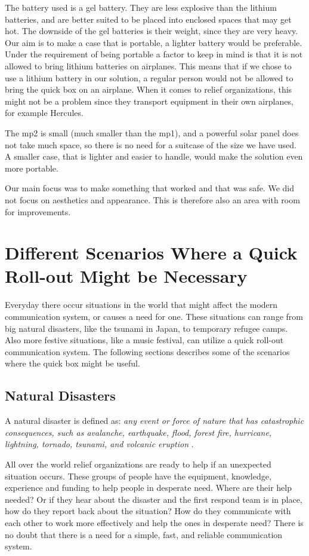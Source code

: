 The battery used is a gel battery. They are less explosive than the lithium batteries, and are better suited to be placed into enclosed spaces that may get hot. The downside of the gel batteries is their weight, since they are very heavy. Our aim is to make a case that is portable, a lighter battery would be preferable. Under the requirement of being portable a factor to keep in mind is that it is not allowed to bring lithium batteries on airplanes. This means that if we chose to use a lithium battery in our solution, a regular person would not be allowed to bring the \gls{quick} box on an airplane. When it comes to relief organizations, this might not be a problem since they transport equipment in their own airplanes, for example Hercules. 

The \gls{mp2} is small (much smaller than the \gls{mp1}), and a powerful solar panel does not take much space, so there is no need for a suitcase of the size we have used. A smaller case, that is lighter and easier to handle, would make the solution even more portable. 

Our main focus was to make something that worked and that was safe. We did not focus on aesthetics and appearance. This is therefore also an area with room for improvements. 

 
\section{Different Scenarios Where a Quick Roll-out Might be Necessary}
Everyday there occur situations in the world that might affect the modern communication system, or causes a need for one. These situations can range from big natural disasters, like the tsunami in Japan, to temporary refugee camps. Also more festive situations, like a music festival, can utilize a quick roll-out communication system. The following sections describes some of the scenarios where the \gls{quick} box might be useful. 

\subsection{Natural Disasters}
A natural disaster is defined as: \textit{any event or force of nature that has catastrophic consequences, such as avalanche, earthquake, flood, forest fire, hurricane, lightning, tornado, tsunami, and volcanic eruption} \cite{naturalDisaster}.

All over the world relief organizations are ready to help if an unexpected situation occurs. These groups of people have the equipment, knowledge, experience and funding to help people in desperate need. Where are their help needed? Or if they hear about the disaster and the first respond team is in place, how do they report back about the situation? How do they communicate with each other to work more effectively and help the ones in desperate need? There is no doubt that there is a need for a simple, fast, and reliable communication system.

